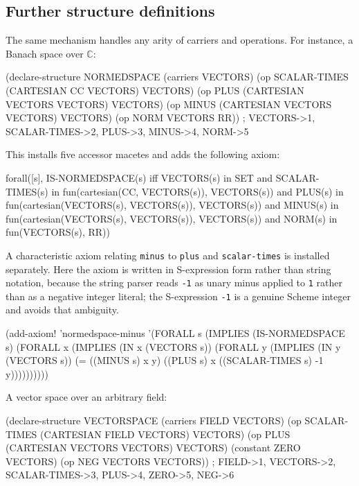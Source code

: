 

\subsection{Further structure definitions}

The same mechanism handles any arity of carriers and operations.  For
instance, a Banach space over $\mathbb{C}$:

\begin{VNBcode}
(declare-structure NORMEDSPACE
  (carriers VECTORS)
  (op SCALAR-TIMES (CARTESIAN CC VECTORS) VECTORS)
  (op PLUS         (CARTESIAN VECTORS VECTORS) VECTORS)
  (op MINUS        (CARTESIAN VECTORS VECTORS) VECTORS)
  (op NORM         VECTORS RR))
; VECTORS->1, SCALAR-TIMES->2, PLUS->3, MINUS->4, NORM->5
\end{VNBcode}

This installs five accessor macetes and adds the following axiom:
\begin{VNBsnip}
forall([s],
  IS-NORMEDSPACE(s) iff
    VECTORS(s) in SET
    and SCALAR-TIMES(s) in fun(cartesian(CC, VECTORS(s)), VECTORS(s))
    and PLUS(s) in fun(cartesian(VECTORS(s), VECTORS(s)), VECTORS(s))
    and MINUS(s) in fun(cartesian(VECTORS(s), VECTORS(s)), VECTORS(s))
    and NORM(s) in fun(VECTORS(s), RR))
\end{VNBsnip}

A characteristic axiom relating \texttt{minus} to \texttt{plus} and
\texttt{scalar-times} is installed separately.  Here the axiom is written
in S-expression form rather than string notation, because the string
parser reads \texttt{-1} as unary minus applied to \texttt{1} rather than
as a negative integer literal; the S-expression \texttt{-1} is a genuine
Scheme integer and avoids that ambiguity.

\begin{VNBcode}
(add-axiom! 'normedspace-minus
  '(FORALL s
     (IMPLIES (IS-NORMEDSPACE s)
       (FORALL x (IMPLIES (IN x (VECTORS s))
         (FORALL y (IMPLIES (IN y (VECTORS s))
           (= ((MINUS s) x y)
              ((PLUS s) x ((SCALAR-TIMES s) -1 y))))))))))
\end{VNBcode}

A vector space over an arbitrary field:
\begin{VNBcode}
(declare-structure VECTORSPACE
  (carriers FIELD VECTORS)
  (op SCALAR-TIMES (CARTESIAN FIELD VECTORS) VECTORS)
  (op PLUS         (CARTESIAN VECTORS VECTORS) VECTORS)
  (constant ZERO VECTORS)
  (op NEG          VECTORS VECTORS))
; FIELD->1, VECTORS->2, SCALAR-TIMES->3, PLUS->4, ZERO->5, NEG->6
\end{VNBcode}

